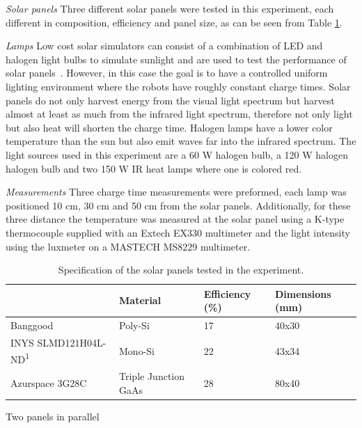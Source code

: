 \textit{Solar panels}
Three different solar panels were tested in this experiment, each different in composition, efficiency and panel size, as can be seen from Table \ref{tab:solar_panels}.

\textit{Lamps}
Low cost solar simulators can consist of a combination of LED and halogen light bulbs to simulate sunlight and are used to test the performance of solar panels~\cite{grandi_tia_2014}.
However, in this case the goal is to have a controlled uniform lighting environment where the robots have roughly constant charge times.
Solar panels do not only harvest energy from the visual light spectrum but harvest almost at least as much from the infrared light spectrum, therefore not only light but also heat will shorten the charge time.
Halogen lamps have a lower color temperature than the sun but also emit waves far into the infrared spectrum.
The light sources used in this experiment are a 60 W halogen bulb, a 120 W halogen halogen bulb and two 150 W IR heat lamps where one is colored red.

\textit{Measurements}
Three charge time measurements were preformed, each lamp was positioned 10 cm, 30 cm and 50 cm from the solar panels.
Additionally, for these three distance the temperature was measured at the solar panel using a K-type thermocouple supplied with an Extech EX330 multimeter and the light intensity using the luxmeter on a MASTECH MS8229 multimeter.

\begin{table}[t]
	\centering
	\begin{threeparttable}
		\caption{Specification of the solar panels tested in the experiment.}
		\label{tab:solar_panels}
		\small
		\begin{tabular}{|l|l|l|l|}
			\hline
			& Material & Efficiency (\%) & Dimensions (mm) \\
			\hline \hline
			Banggood \cite{bangood_solar_2017}& Poly-Si & 17 & 40x30 \\
			INYS SLMD121H04L-ND\textsuperscript{1}& Mono-Si & 22 & 43x34 \\
			Azurspace 3G28C & Triple Junction GaAs& 28 & 80x40 \\
			\hline
		\end{tabular}
		\begin{tablenotes}
			\small
			\item [1] Two panels in parallel
		\end{tablenotes}
	\end{threeparttable}
\end{table}

